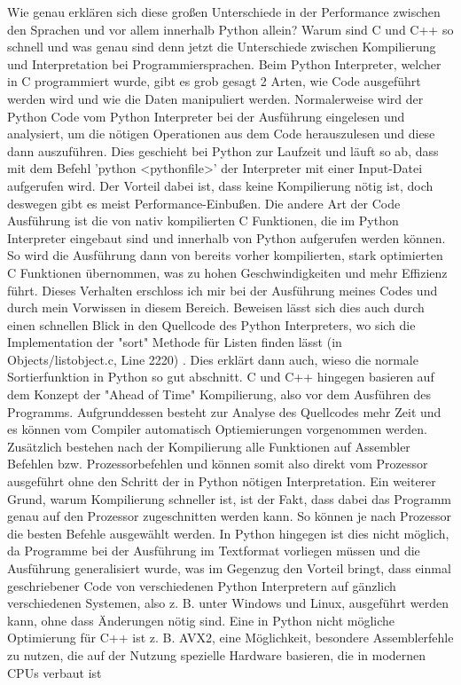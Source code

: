\documentclass[10pt,a4paper]{article}
\begin{document}
Wie genau erklären sich diese großen Unterschiede in der Performance zwischen den Sprachen und vor allem innerhalb Python allein?
Warum sind C und C++ so schnell und was genau sind denn jetzt die Unterschiede zwischen Kompilierung und Interpretation bei Programmiersprachen.
Beim Python Interpreter, welcher in C programmiert wurde, gibt es grob gesagt 2 Arten, wie Code ausgeführt werden wird und
wie die Daten manipuliert werden. Normalerweise wird der Python Code vom Python Interpreter bei der Ausführung eingelesen und analysiert,
um die nötigen Operationen aus dem Code herauszulesen und diese dann auszuführen. Dies geschieht bei Python zur Laufzeit und läuft so ab,
dass mit dem Befehl 'python <pythonfile>' der Interpreter mit einer Input-Datei aufgerufen wird. Der Vorteil dabei ist, dass keine Kompilierung nötig ist,
doch deswegen gibt es meist Performance-Einbußen. Die andere Art der Code Ausführung ist die von nativ kompilierten C Funktionen,
die im Python Interpreter eingebaut sind und innerhalb von Python aufgerufen werden können. So wird die Ausführung dann von
bereits vorher kompilierten, stark optimierten C Funktionen übernommen, was zu hohen Geschwindigkeiten und mehr Effizienz führt.
Dieses Verhalten erschloss ich mir bei der Ausführung meines Codes und durch mein Vorwissen in diesem Bereich. Beweisen lässt sich
dies auch durch einen schnellen Blick in den Quellcode des Python Interpreters, wo sich die Implementation der "sort" Methode für Listen
finden lässt (in Objects/listobject.c, Line 2220) \cite{pythonsource}. Dies erklärt dann auch, wieso die normale Sortierfunktion in Python so gut abschnitt.
C und C++ hingegen basieren auf dem Konzept der "Ahead of Time" Kompilierung, also vor dem Ausführen des Programms.
Aufgrunddessen besteht zur Analyse des Quellcodes mehr Zeit und es können vom Compiler automatisch Optiemierungen vorgenommen werden.
Zusätzlich bestehen nach der Kompilierung alle Funktionen auf Assembler Befehlen bzw. Prozessorbefehlen und können somit
also direkt vom Prozessor ausgeführt ohne den Schritt der in Python nötigen Interpretation.
Ein weiterer Grund, warum Kompilierung schneller ist, ist der Fakt, dass dabei das Programm genau auf den Prozessor zugeschnitten
werden kann. So können je nach Prozessor die besten Befehle ausgewählt werden. In Python hingegen ist dies nicht möglich,
da Programme bei der Ausführung im Textformat vorliegen müssen und die Ausführung generalisiert wurde, was im Gegenzug den Vorteil bringt,
dass einmal geschriebener Code von verschiedenen Python Interpretern auf gänzlich verschiedenen Systemen, also z. B. unter Windows und Linux,
ausgeführt werden kann, ohne dass Änderungen nötig sind.
Eine in Python nicht mögliche Optimierung für C++ ist z. B. AVX2, eine Möglichkeit, besondere Assemblerfehle
zu nutzen, die auf der Nutzung spezielle Hardware basieren, die in modernen CPUs verbaut ist
\end{document}
